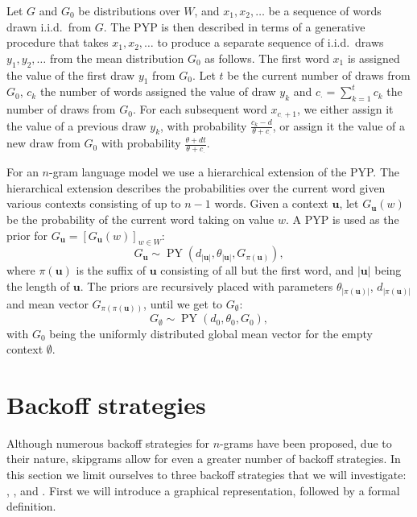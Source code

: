   Let $G$ and $G_0$ be distributions over $W$, and $x_1,x_2,\ldots$ be a sequence of words drawn i.i.d.\ from $G$. The PYP is then described in terms of a generative procedure that takes  $x_1,x_2,\ldots$ to produce a separate sequence of i.i.d.\ draws $y_1,y_2,\ldots$ from the mean distribution $G_0$ as follows. The first word $x_1$ is assigned the value of the first draw $y_1$ from $G_0$. Let $t$ be the current number of draws from $G_0$, $c_k$ the number of words assigned the value of draw $y_k$ and $c_\cdot = \sum^t_{k=1}c_k$ the number of draws from $G_0$. For each subsequent word $x_{c_\cdot+1}$, we either assign it the value of a previous draw $y_k$, with probability $\frac{c_k-d}{\theta+c_\cdot}$, or assign it the value of a new draw from $G_0$ with probability $\frac{\theta+dt}{\theta+c_\cdot}$.

For an $n$-gram language model we use a hierarchical extension of the PYP. The hierarchical extension describes the probabilities over the current word given various contexts consisting of up to $n-1$ words. Given a context $\mathbf{u}$, let $G_\mathbf{u}(w)$ be the probability of the current word taking on value $w$. A PYP is used as the prior for $G_\mathbf{u}=[G_\mathbf{u}(w)]_{w\in W}$: 
  \begin{equation*}
  	G_\mathbf{u}\sim\operatorname{PY}(d_{|\mathbf{u}|}, \theta_{|\mathbf{u}|},G_{\pi(\mathbf{u})}),
  \end{equation*}
where $\pi(\mathbf{u})$ is the suffix of $\mathbf{u}$ consisting of all but the first word, and $|\mathbf{u}|$ being the length of $\mathbf{u}$. The priors are recursively placed with parameters $\theta_{|\pi(\mathbf{u})|}$, $d_{|\pi(\mathbf{u})|}$ and mean vector $G_{\pi(\pi(\mathbf{u}))}$, until we get to $G_\emptyset$: 		\begin{equation*}
		G_\emptyset \sim\operatorname{PY}(d_0,\theta_0,G_0),
    \end{equation*}\vspace{-0.05cm}
with $G_0$ being the uniformly distributed global mean vector for the empty context $\emptyset$.

\section{Backoff strategies}

Although numerous backoff strategies for $n$-grams have been proposed\cite{chen1996empirical}, due to their nature, skipgrams allow for even a greater number of backoff strategies. In this section we limit ourselves to three backoff strategies that we will investigate: \BON, \BOL, and \BOF. First we will introduce a graphical representation, followed by a formal definition.

